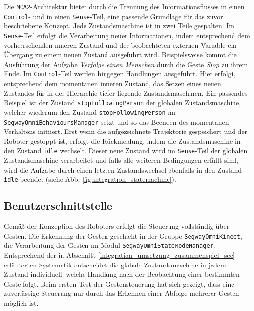 Die \lstinline{MCA2}-Architektur bietet durch die Trennung des Informationsflusses in 
einen \lstinline{Control}- und in einen \lstinline{Sense}-Teil, eine passende Grundlage für das zuvor beschriebene Konzept.
Jede Zustandsmaschine ist in zwei Teile gespalten.
Im \lstinline{Sense}-Teil erfolgt die Verarbeitung neuer Informationen, indem entsprechend dem vorherrschenden inneren Zustand und der beobachteten externen Variable ein Übergang zu einem neuen Zustand ausgeführt wird.
Beispielsweise kommt die Ausführung der Aufgabe \textit{Verfolge einen Menschen} durch die Geste \textit{Stop} zu ihrem Ende.
Im \lstinline{Control}-Teil werden hingegen Handlungen ausgeführt.
Hier erfolgt, entsprechend dem momentanen inneren Zustand, \zB das Setzen eines neuen Zustandes für in der Hierarchie tiefer liegende Zustandsmaschinen.
Ein passendes Beispiel ist der Zustand \lstinline{stopFollowingPerson} der
globalen Zustandsmaschine, welcher wiederum den Zustand \lstinline{stopFollowingPerson} im
\lstinline{SegwayOmniBehavioursManager} setzt und so das Beenden des momentanen Verhaltens initiiert.
Erst wenn die aufgezeichnete Trajektorie gespeichert und der Roboter gestoppt ist, erfolgt die Rückmeldung, indem die Zustandsmaschine in den Zustand \lstinline{idle} wechselt.
Dieser neue Zustand wird im \lstinline{Sense}-Teil der globalen Zustandsmaschine verarbeitet und falls alle weiteren Bedingungen erfüllt sind, wird die Aufgabe durch einen letzten Zustandswechsel ebenfalls in den Zustand \lstinline{idle} beendet (siehe Abb. \ref{fig:integration_statemachine}).


\subsection{Benutzerschnittstelle}
\label{benutzerschnittstelle_integration_cha}

Gemäß der Konzeption des Roboters erfolgt die Steuerung vollständig über Gesten.
Die Erkennung der Gesten geschieht in der Gruppe \lstinline{SegwayOmniKinect}, die Verarbeitung der Gesten im Modul \lstinline{SegwayOmniStateModeManager}.
Entsprechend der in Abschnitt \ref{integration_umsetzung_zusammenspiel_sec} erläuterten Systematik entscheidet die globale Zustandsmaschine in jedem Zustand individuell, welche Handlung nach der Beobachtung einer bestimmten Geste folgt.
Beim ersten Test der Gestensteuerung hat sich gezeigt, dass eine zuverlässige Steuerung nur durch das Erkennen einer Abfolge mehrerer Gesten möglich ist.

